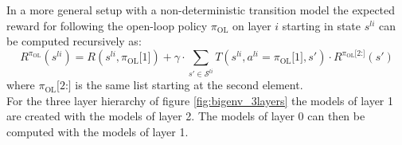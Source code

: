 In a more general setup with a non-deterministic transition model the expected reward for following the open-loop policy $\pi_\text{OL}$ on layer $i$ starting in state $s^{li}$ can be computed recursively as:
\begin{equation}\label{eq:R_OL}
    R^{\pi_\text{OL}}\left( s^{li} \right) = R\left(s^{li}, \pi_\text{OL}\texttt{[$1$]}\right) + \gamma \cdot \sum_{s'\in \mathcal{S}^{li}}T\left( s^{li}, a^{li}=\pi_\text{OL}\texttt{[$1$]}, s' \right)\cdot R^{\pi_\text{OL}\texttt{[$2$:]}}\left( s' \right)
\end{equation}
where $\pi_\text{OL}\texttt{[$2$:]}$ is the same list starting at the second element.\\
For the three layer hierarchy of figure \ref{fig:bigenv_3layers} the models of layer 1 are created with the models of layer 2. The models of layer 0 can then be computed with the models of layer 1.\\

